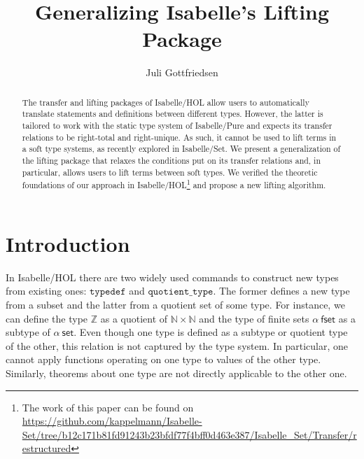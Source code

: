 \documentclass{article}
\title{Generalizing Isabelle's Lifting Package}
\date{}
\author{Juli Gottfriedsen}
\theoremstyle{definition}
\newcommand{\nat}{\mathbb{N}}
\newcommand{\inte}{\mathbb{Z}}
\begin{document}
\maketitle
\begin{abstract}
The transfer and lifting packages of Isabelle/HOL
allow users to automatically translate statements and definitions between different types.
However, the latter is tailored to work with the static type system of Isabelle/Pure
and expects its transfer relations to be right-total and right-unique.
As such, it cannot be used to lift terms in a soft type systems,
as recently explored in Isabelle/Set.
We present a generalization of the lifting package that
relaxes the conditions put on its transfer relations and,
in particular,
allows users to lift terms between soft types.
We verified the theoretic foundations of our approach in Isabelle/HOL\footnote{The work of this paper can be found on \url{https://github.com/kappelmann/Isabelle-Set/tree/b12c171b81fd91243b23bfdf77f4bff0d463e387/Isabelle_Set/Transfer/restructured}}
and propose a new lifting algorithm.
\end{abstract}

\section{Introduction}
In Isabelle/HOL there are two widely used commands to construct new types from existing ones: \(\mathtt{typedef}\) and \(\mathtt{quotient\_type}\).
The former defines a new type from a subset and the latter from a quotient set of some type.
For instance, we can define the type \(\inte\) as a quotient of \(\nat \times \nat\) and the type of finite sets \(\alpha\ \mathsf{fset}\) as a subtype of \(\alpha\ \mathsf{set}\). Even though one type is defined as a subtype or quotient type of the other,
this relation is not captured by the type system.
In particular, one cannot apply functions operating on one type to values of the other type.
Similarly, theorems about one type are not directly applicable to the other one.
\end{document}
